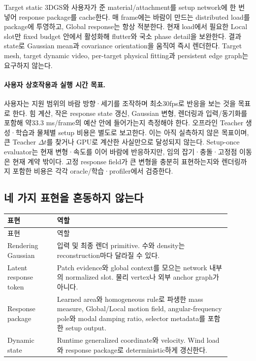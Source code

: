 \documentclass[11pt]{article}
\begin{document}
\begin{tcolorbox}[colback=CoreLight,colframe=CoreBlue,title=Target setup and runtime,fonttitle=\bfseries]
Target static 3DGS와 사용자가 준 material/attachment를 setup network에 한 번 넣어 response package를 cache한다.
매 frame에는 바람이 만드는 distributed load를 package에 투영하고, Global response는 항상 적분한다.
현재 load에서 필요한 Local slot만 fixed budget 안에서 활성화해 flutter와 국소 phase detail을 보완한다.
결과 state로 Gaussian mean과 covariance orientation을 움직여 즉시 렌더한다.
Target mesh, target dynamic video, per-target physical fitting과 persistent edge graph는 요구하지 않는다.
\end{tcolorbox}

\paragraph{사용자 상호작용과 실행 시간 목표.}
사용자는 지원 범위의 바람 방향·세기를 조작하며 최소30fps로 반응을 보는 것을 목표로 한다.
힘 계산, 작은 response state 갱신, Gaussian 변형, 렌더링과 입력/동기화를 포함해 약33.3 ms/frame의
예산 안에 들어가는지 측정해야 한다. 오프라인 Teacher 생성·학습과 물체별 setup 비용은 별도로 보고한다.
이는 아직 실측하지 않은 목표이며, 큰 Teacher \(\Delta t\)를 찾거나 GPU로 계산한 사실만으로 달성되지 않는다.
Setup-once evaluator는 현재 변형·속도를 이어 바람에 반응하지만, 임의 잡기·충돌·고정점 이동은 현재 계약 밖이다.
고정 response field가 큰 변형을 충분히 표현하는지와 렌더링까지 포함한 비용은 각각 oracle/학습·profiler에서 검증한다.

\subsection{네 가지 표현을 혼동하지 않는다}

\begin{longtable}{L{0.20\linewidth}L{0.70\linewidth}}
\toprule
표현 & 역할\\
\midrule
\endfirsthead
\toprule
표현 & 역할\\
\midrule
\endhead
Rendering Gaussian & 입력 및 최종 렌더 primitive. 수와 density는 reconstruction마다 달라질 수 있다.\\
Latent response token & Patch evidence와 global context를 모으는 network 내부의 normalized slot. 물리 vertex나 외부 anchor graph가 아니다.\\
Response package & Learned area와 homogeneous rule로 파생한 mass measure, Global/Local motion field,
angular-frequency pole와 modal damping ratio, selector metadata를 포함한 setup output.\\
Dynamic state & Runtime generalized coordinate와 velocity. Wind load와 response package로 deterministic하게 갱신한다.\\
\bottomrule
\end{longtable}
\end{document}
